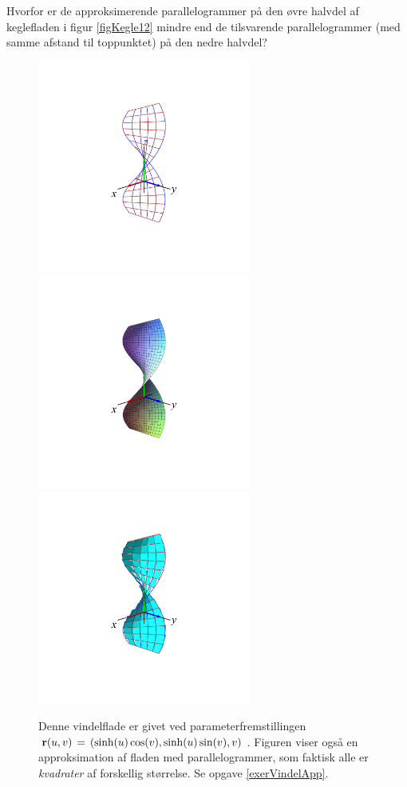 \begin{exercise}
Hvorfor er de approksimerende parallelogrammer på
den øvre halvdel af keglefladen i figur
\ref{figKegle12} mindre end de tilsvarende
parallelogrammer (med samme afstand til
toppunktet) på den nedre halvdel?
\end{exercise}







\begin{figure}[h]
\centerline{\includegraphics[height=70mm]{FIGS/plotVindel1} \includegraphics[height=70mm]{FIGS/plotVindel2} \includegraphics[height=70mm]{FIGS/plotVindel3}   }
\begin{center}
\caption{\small{Denne vindelflade er givet ved
parameterfremstillingen ${\bf r}(u, v) \, = \,
(\sinh(u)\cos(v), \sinh(u)\sin(v), v) \,$.
Figuren viser også en approksimation af fladen med
parallelogrammer, som faktisk alle er \emph{kvadrater}
af forskellig størrelse. Se opgave
\ref{exerVindelApp}.}} \label{figVindel12}
\end{center}
\end{figure}

